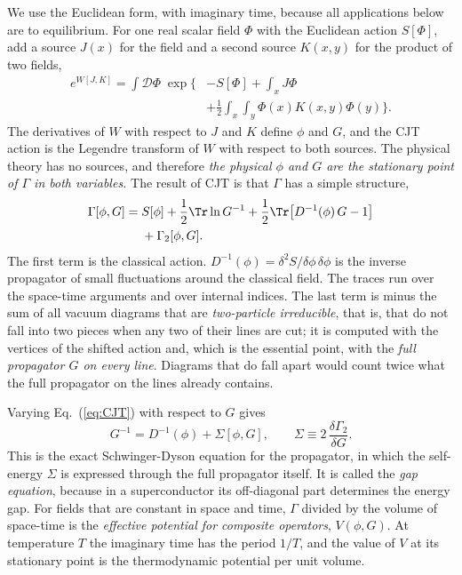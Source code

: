 We use the Euclidean form, with imaginary time, because all applications below are to equilibrium.
For one real scalar field $\Phi$ with the Euclidean action $S[\Phi]$, add a source $J(x)$ for the
field and a second source $K(x,y)$ for the product of two fields,
\begin{align}
e^{W[J,K]}=\int\!\mathcal D\Phi\;\exp\Big\{&-S[\Phi]+\int_x J\Phi\nonumber\\
&+\frac12\int_x\!\int_y\Phi(x)K(x,y)\Phi(y)\Big\}.
\label{eq:WJK}
\end{align}
The derivatives of $W$ with respect to $J$ and $K$ define $\phi$ and $G$, and the CJT action is the
Legendre transform of $W$ with respect to both sources. The physical theory has no sources, and
therefore \emph{the physical $\phi$ and $G$ are the stationary point of $\Gamma$ in both variables.}
The result of CJT is that $\Gamma$ has a simple structure,
\begin{align}
\Gamma[\phi,G]={}&S[\phi]+\frac12\Tr\ln G^{-1}+\frac12\Tr\big[D^{-1}(\phi)\,G-1\big]\nonumber\\
&+\Gamma_2[\phi,G].
\label{eq:CJT}
\end{align}
The first term is the classical action. $D^{-1}(\phi)=\delta^2S/\delta\phi\,\delta\phi$ is the inverse
propagator of small fluctuations around the classical field. The traces run over the space-time
arguments and over internal indices. The last term is minus the sum of all vacuum diagrams that are
\emph{two-particle irreducible}, that is, that do not fall into two pieces when any two of their lines
are cut; it is computed with the vertices of the shifted action and, which is the essential point,
with the \emph{full propagator $G$ on every line}. Diagrams that do fall apart would count twice what
the full propagator on the lines already contains.

Varying Eq.~(\ref{eq:CJT}) with respect to $G$ gives
\begin{equation}
G^{-1}=D^{-1}(\phi)+\Sigma[\phi,G],\qquad\Sigma\equiv2\,\frac{\delta\Gamma_2}{\delta G}.
\label{eq:SD}
\end{equation}
This is the exact Schwinger-Dyson equation for the propagator, in which the self-energy $\Sigma$ is
expressed through the full propagator itself. It is called the \emph{gap equation}, because in a
superconductor its off-diagonal part determines the energy gap. For fields that are constant in space
and time, $\Gamma$ divided by the volume of space-time is the \emph{effective potential for composite
operators}, $V(\phi,G)$. At temperature $T$ the imaginary time has the period $1/T$, and the value of
$V$ at its stationary point is the thermodynamic potential per unit volume.

